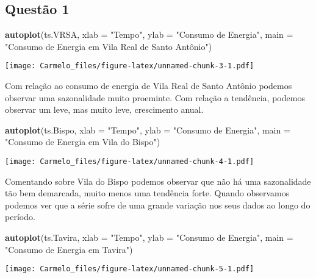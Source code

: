 \documentclass[
  14pt,
]{article}
\newenvironment{Shaded}{\begin{snugshade}}{\end{snugshade}}
\newcommand{\AttributeTok}[1]{\textcolor[rgb]{0.13,0.29,0.53}{#1}}
\newcommand{\FunctionTok}[1]{\textcolor[rgb]{0.13,0.29,0.53}{\textbf{#1}}}
\newcommand{\NormalTok}[1]{#1}
\newcommand{\StringTok}[1]{\textcolor[rgb]{0.31,0.60,0.02}{#1}}
\begin{document}
\subsection{Questão 1}\label{questuxe3o-1}

\begin{Shaded}
\begin{Highlighting}[]
\FunctionTok{autoplot}\NormalTok{(ts.VRSA, }\AttributeTok{xlab =} \StringTok{"Tempo"}\NormalTok{, }\AttributeTok{ylab =} \StringTok{"Consumo de Energia"}\NormalTok{, }\AttributeTok{main =} \StringTok{"Consumo de Energia em Vila Real de Santo Antônio"}\NormalTok{)}
\end{Highlighting}
\end{Shaded}

\texttt{[image: Carmelo\_files/figure-latex/unnamed-chunk-3-1.pdf]}

Com relação ao consumo de energia de Vila Real de Santo Antônio podemos
observar uma sazonalidade muito proeminte. Com relação a tendência,
podemos observar um leve, mas muito leve, crescimento anual.

\begin{Shaded}
\begin{Highlighting}[]
\FunctionTok{autoplot}\NormalTok{(ts.Bispo, }\AttributeTok{xlab =} \StringTok{"Tempo"}\NormalTok{, }\AttributeTok{ylab =} \StringTok{"Consumo de Energia"}\NormalTok{, }\AttributeTok{main =} \StringTok{"Consumo de Energia em Vila do Bispo"}\NormalTok{)}
\end{Highlighting}
\end{Shaded}

\texttt{[image: Carmelo\_files/figure-latex/unnamed-chunk-4-1.pdf]}

Comentando sobre Vila do Bispo podemos observar que não há uma
sazonalidade tão bem demarcada, muito menos uma tendência forte. Quando
observamos podemos ver que a série sofre de uma grande variação nos seus
dados ao longo do período.

\begin{Shaded}
\begin{Highlighting}[]
\FunctionTok{autoplot}\NormalTok{(ts.Tavira, }\AttributeTok{xlab =} \StringTok{"Tempo"}\NormalTok{, }\AttributeTok{ylab =} \StringTok{"Consumo de Energia"}\NormalTok{, }\AttributeTok{main =} \StringTok{"Consumo de Energia em Tavira"}\NormalTok{)}
\end{Highlighting}
\end{Shaded}

\texttt{[image: Carmelo\_files/figure-latex/unnamed-chunk-5-1.pdf]}
\end{document}
